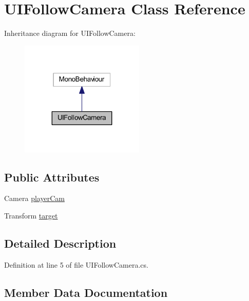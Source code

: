 \hypertarget{class_u_i_follow_camera}{}\section{U\+I\+Follow\+Camera Class Reference}
\label{class_u_i_follow_camera}


Inheritance diagram for U\+I\+Follow\+Camera\+:
\nopagebreak
\begin{figure}[H]
\begin{center}
\leavevmode
\includegraphics[width=167pt]{class_u_i_follow_camera__inherit__graph}
\end{center}
\end{figure}
\subsection*{Public Attributes}
\begin{DoxyCompactItemize}
\item 
Camera \hyperlink{class_u_i_follow_camera_abd70aa1abb4acc961761ab0116b8f3fc}{player\+Cam}
\item 
Transform \hyperlink{class_u_i_follow_camera_a286876284df5954c8be56bea0bb075f7}{target}
\end{DoxyCompactItemize}


\subsection{Detailed Description}


Definition at line 5 of file U\+I\+Follow\+Camera.\+cs.



\subsection{Member Data Documentation}
\mbox{\label{class_u_i_follow_camera_abd70aa1abb4acc961761ab0116b8f3fc}} 
